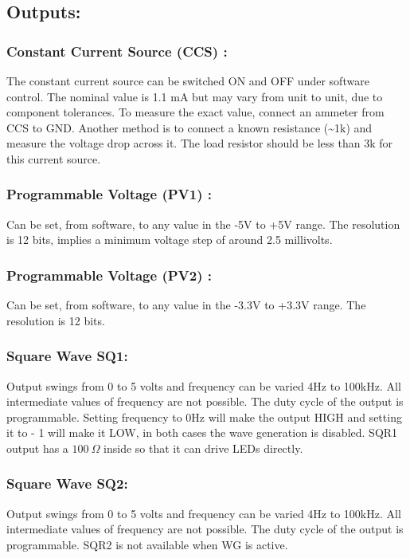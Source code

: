 \documentclass[a4paper,12pt,english]{sphinxmanual}
\begin{document}
\subsection{Outputs:}
\label{\detokenize{1.2:outputs}}

\subsubsection{Constant Current Source (CCS) :}
\label{\detokenize{1.2:constant-current-source-ccs}}
The constant current source can be switched ON and OFF under software
control. The nominal value is 1.1 mA but may vary from unit to unit, due
to component tolerances. To measure the exact value, connect an ammeter
from CCS to GND. Another method is to connect a known resistance (\textasciitilde{}1k)
and measure the voltage drop across it. The load resistor should be less
than 3k for this current source.


\subsubsection{Programmable Voltage (PV1) :}
\label{\detokenize{1.2:programmable-voltage-pv1}}
Can be set, from software, to any value in the -5V to +5V range. The
resolution is 12 bits, implies a minimum voltage step of around 2.5
millivolts.


\subsubsection{Programmable Voltage (PV2) :}
\label{\detokenize{1.2:programmable-voltage-pv2}}
Can be set, from software, to any value in the -3.3V to +3.3V range. The
resolution is 12 bits.


\subsubsection{Square Wave SQ1:}
\label{\detokenize{1.2:square-wave-sq1}}
Output swings from 0 to 5 volts and frequency can be varied 4Hz to
100kHz. All intermediate values of frequency are not possible. The duty
cycle of the output is programmable. Setting frequency to 0Hz will make
the output HIGH and setting it to  - 1 will make it LOW, in both cases
the wave generation is disabled. SQR1 output has a \(100~\Omega\)  inside so that it can drive LEDs directly.


\subsubsection{Square Wave SQ2:}
\label{\detokenize{1.2:square-wave-sq2}}
Output swings from 0 to 5 volts and frequency can be varied 4Hz to
100kHz. All intermediate values of frequency are not possible. The duty
cycle of the output is programmable. SQR2 is not available when WG is
active.
\end{document}
